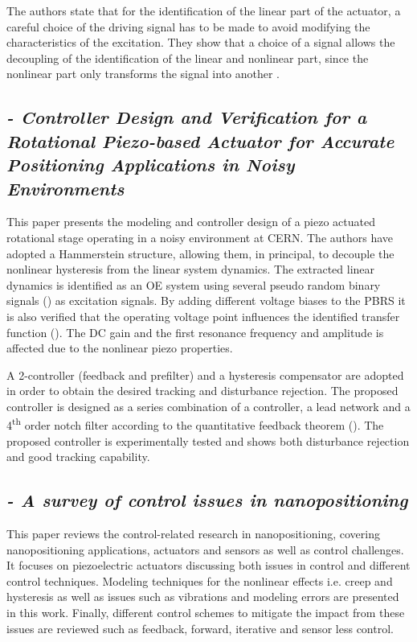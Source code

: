 The authors state that for the identification of the linear part of the actuator, a careful choice of the driving signal has to be made to avoid modifying the characteristics of the excitation. They show that a choice of a \abbrPBRS signal allows the decoupling of the identification of the linear and nonlinear part, since the nonlinear part only transforms the \abbrPBRS signal into another \abbrPBRS.



\subsection*{\citep*{ButcherController:2015} {\small \emph{- Controller Design and Verification for a Rotational Piezo-based Actuator for Accurate Positioning Applications in Noisy Environments}} }
This paper presents the modeling and controller design of a piezo actuated rotational stage operating in a noisy environment at CERN. The authors have adopted a Hammerstein structure, allowing them, in principal, to decouple the nonlinear hysteresis from the linear system dynamics. The extracted linear dynamics is identified as an OE system using several pseudo random binary signals (\abbrPBRS) as excitation signals. By adding different voltage biases to the PBRS it is also verified that the operating voltage point influences the identified transfer function (\abbrTF). The DC gain and the first resonance frequency and amplitude is affected due to the nonlinear piezo properties.

A 2-\abbrDOF controller (feedback and prefilter) and a hysteresis compensator are adopted in order to obtain the desired tracking and disturbance rejection. The proposed controller is designed as a series combination of a \abbrPID controller, a lead network and a 4\textsuperscript{th} order notch filter according to the quantitative feedback theorem (\abbrQFT). The proposed controller is experimentally tested and shows both disturbance rejection and good tracking capability.

\subsection*{\citep*{SurveyOfControlIssues:2007} {\small \emph{- A survey of control issues in nanopositioning}} }
This paper reviews the control-related research in nanopositioning, covering nanopositioning applications, actuators and sensors as well as control challenges. It focuses on piezoelectric actuators discussing both issues in control and different control techniques. Modeling techniques for the nonlinear effects i.e. creep and hysteresis as well as issues such as vibrations and modeling errors are presented in this work. Finally, different control schemes to mitigate the impact from these issues are reviewed such as feedback, forward, iterative and sensor less control.


